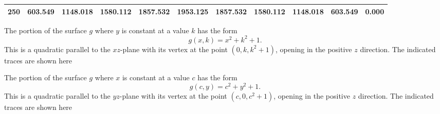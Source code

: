 \begin{activitySolution}
\begin{center}
\begin{tabular}{|c|c|c|c|c|c|c|c|c|c|c|}
250     &603.549    &1148.018   &1580.112   &1857.532   &1953.125   &1857.532   &1580.112   &1148.018   &603.549    &0.000 \\ \hline
\end{tabular}
\end{center}
\item The portion of the surface $g$ where $y$ is constant at a value $k$ has the form 
\[g(x,k) = x^2+k^2+1.\]
This is a quadratic parallel to the $xz$-plane with its vertex at the point $(0,k,k^2+1)$, opening in the positive $z$ direction. The indicated traces are shown here %
\begin{center}
\end{center}
 \item The portion of the surface $g$ where $x$ is constant at a value $c$ has the form 
\[g(c,y) = c^2+y^2+1.\]
This is a quadratic parallel to the $yz$-plane with its vertex at the point $(c,0,c^2+1)$, opening in the positive $z$ direction. The indicated traces are shown here %

\end{activitySolution}
